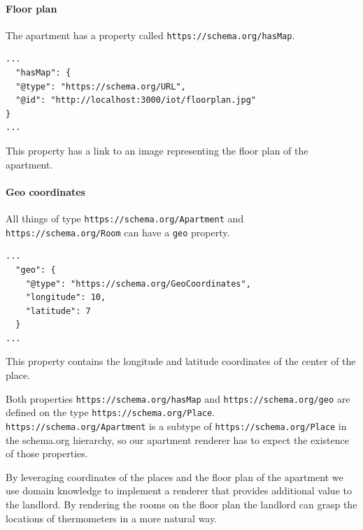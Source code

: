 \paragraph{Floor plan}
The apartment has a property called \lstinline{https://schema.org/hasMap}.

\lstset{language=JSON}
\begin{lstlisting}[caption=The \lstinline{hasMap} property of apartment /apartments/0.]
...
  "hasMap": {
  "@type": "https://schema.org/URL",
  "@id": "http://localhost:3000/iot/floorplan.jpg"
}
...
\end{lstlisting}

This property has a link to an image representing the floor plan of the apartment.

\paragraph{Geo coordinates}
All things of type \lstinline{https://schema.org/Apartment} and \lstinline{https://schema.org/Room} can have a \lstinline{geo} property.

\lstset{language=JSON}
\begin{lstlisting}[caption=The \lstinline{https://schema.org/geo} property of apartment /apartments/0.]
...
  "geo": {
    "@type": "https://schema.org/GeoCoordinates",
    "longitude": 10,
    "latitude": 7
  }
...
\end{lstlisting}

This property contains the longitude and latitude coordinates of the center of the place.

Both properties \lstinline{https://schema.org/hasMap} and \lstinline{https://schema.org/geo} are defined on the type \lstinline{https://schema.org/Place}. \lstinline{https://schema.org/Apartment} is a subtype of \lstinline{https://schema.org/Place} in the schema.org hierarchy, so our apartment renderer has to expect the existence of those properties.

By leveraging coordinates of the places and the floor plan of the apartment we use domain knowledge to implement a renderer that provides additional value to the landlord. By rendering the rooms on the floor plan the landlord can grasp the locations of thermometers in a more natural way.

